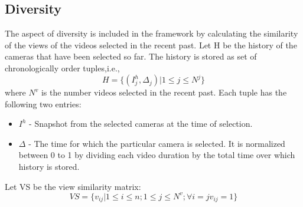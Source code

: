 \documentclass{IEEEtran}
\begin{document}
\subsection{Diversity}
The aspect of diversity is included in the framework by calculating the similarity of the views of the videos selected in the recent past. Let H be the history of the cameras that have been selected so far. The history is stored as set of chronologically order tuples,i.e.,
\[
 H = \big\{(I_j^h,\Delta_j)|1\leq j \leq N^j\big\}
\]
where $N^v$ is the number videos selected in the recent past. Each tuple has the following two entries:
\begin{itemize}
    \item $I^h$ - Snapshot from the selected cameras at the time of selection.
    \item $\Delta$ - The time for which the particular camera is selected. It is normalized between 0 to 1 by dividing each video duration by the total time over which history is stored. 
\end{itemize}
Let VS be the view similarity matrix:
\[
 VS = \big\{ v_{ij}| 1 \leq i \leq n;1 \leq j \leq N^v;\forall i =j v_{ij}=1\big\}
\]
\end{document}
